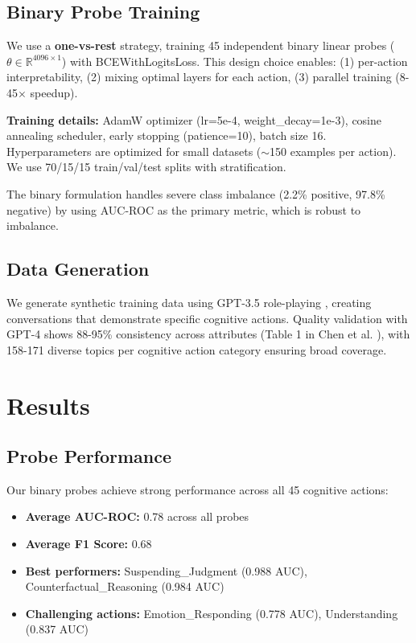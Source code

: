 \documentclass[letterpaper]{article}
\begin{document}
\subsection{Binary Probe Training}

We use a \textbf{one-vs-rest} strategy, training 45 independent binary linear probes ($\theta \in \mathbb{R}^{4096 \times 1}$) with BCEWithLogitsLoss. This design choice enables: (1) per-action interpretability, (2) mixing optimal layers for each action, (3) parallel training (8-45$\times$ speedup).

\textbf{Training details:} AdamW optimizer (lr=5e-4, weight\_decay=1e-3), cosine annealing scheduler, early stopping (patience=10), batch size 16. Hyperparameters are optimized for small datasets ($\sim$150 examples per action). We use 70/15/15 train/val/test splits with stratification.

The binary formulation handles severe class imbalance (2.2\% positive, 97.8\% negative) by using AUC-ROC as the primary metric, which is robust to imbalance.

\subsection{Data Generation}

We generate synthetic training data using GPT-3.5 role-playing \cite{chen2024designing}, creating conversations that demonstrate specific cognitive actions. Quality validation with GPT-4 shows 88-95\% consistency across attributes (Table 1 in Chen et al. \cite{chen2024designing}), with 158-171 diverse topics per cognitive action category ensuring broad coverage.

\section{Results}

\subsection{Probe Performance}

Our binary probes achieve strong performance across all 45 cognitive actions:
\begin{itemize}
    \item \textbf{Average AUC-ROC:} 0.78 across all probes
    \item \textbf{Average F1 Score:} 0.68
    \item \textbf{Best performers:} Suspending\_Judgment (0.988 AUC), Counterfactual\_Reasoning (0.984 AUC)
    \item \textbf{Challenging actions:} Emotion\_Responding (0.778 AUC), Understanding (0.837 AUC)
\end{itemize}
\end{document}
